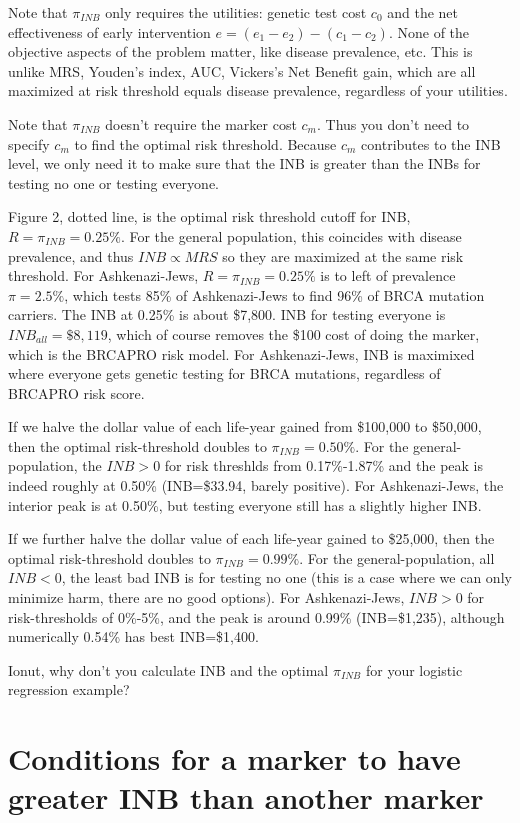 \documentclass[11pt]{article}
\begin{document}
Note that $\pi_{INB}$ only requires the utilities: genetic test cost $c_0$ and the net effectiveness of early intervention $e=(e_1-e_2)-(c_1-c_2)$.  None of the objective aspects of the problem matter, like disease prevalence, etc.  This is unlike MRS, Youden's index, AUC, Vickers's Net Benefit gain, which are all maximized at risk threshold equals disease prevalence, regardless of your utilities.

Note that $\pi_{INB}$ doesn't require the marker cost $c_m$.  Thus you don't need to specify $c_m$ to find the optimal risk threshold.  Because $c_m$ contributes to the INB level, we only need it to make sure that the INB is greater than the INBs for testing no one or testing everyone.

Figure 2, dotted line, is the optimal risk threshold cutoff for INB, $R=\pi_{INB}=0.25\%$.  For the general population, this coincides with disease prevalence, and thus $INB\propto MRS$ so they are maximized at the same risk threshold.  For Ashkenazi-Jews, $R=\pi_{INB}=0.25\%$ is to left of prevalence $\pi=2.5\%$, which tests 85\% of Ashkenazi-Jews to find 96\% of BRCA mutation carriers.  The INB at 0.25\% is about \$7,800. INB for testing everyone is $INB_{all}=\$8,119$, which of course removes the \$100 cost of doing the marker, which is the BRCAPRO risk model.  For Ashkenazi-Jews, INB is maximixed where everyone gets genetic testing for BRCA mutations, regardless of BRCAPRO risk score.

If we halve the dollar value of each life-year gained from \$100,000 to \$50,000, then the optimal risk-threshold doubles to $\pi_{INB}=0.50\%$.  For the general-population, the $INB>0$ for risk threshlds from 0.17\%-1.87\% and the peak is indeed roughly at 0.50\% (INB=\$33.94, barely positive).  For Ashkenazi-Jews, the interior peak is at 0.50\%, but testing everyone still has a slightly higher INB.  

If we further halve the dollar value of each life-year gained to \$25,000, then the optimal risk-threshold doubles to $\pi_{INB}=0.99\%$.  For the general-population, all $INB<0$, the least bad INB is for testing no one (this is a case where we can only minimize harm, there are no good options).  For Ashkenazi-Jews, $INB>0$ for risk-thresholds of 0\%-5\%, and the peak is around 0.99\% (INB=\$1,235), although numerically 0.54\% has best INB=\$1,400.

Ionut, why don't you calculate INB and the optimal $\pi_{INB}$ for your logistic regression example?

\section{Conditions for a marker to have greater INB than another marker}
\end{document}
